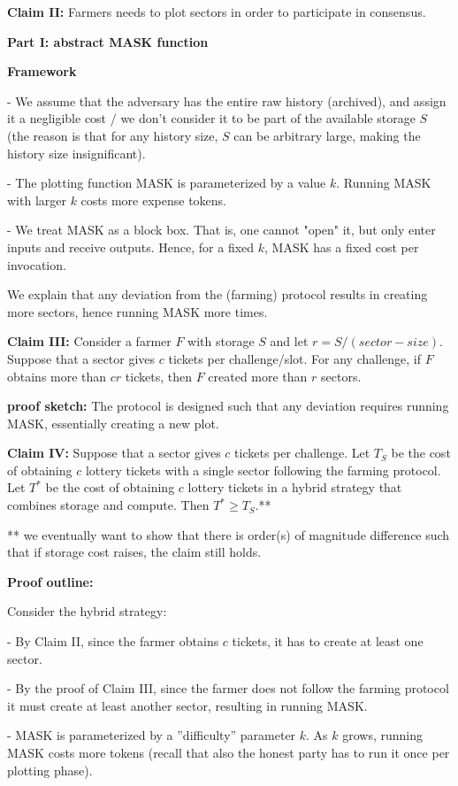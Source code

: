\documentclass[12pt,draftcls,onecolumn]{IEEEtran}
\begin{document}
{\bf Claim II:} Farmers needs to plot sectors in order to participate in consensus.


\textbf{Part I: abstract MASK function}

\textbf{Framework}

- We assume that the adversary has the entire raw history (archived), and assign it a negligible cost / we don't consider it to be part of the available storage $S$ (the reason is that for any history size, $S$ can be arbitrary large, making the history size insignificant).

- The plotting function MASK is parameterized by a value $k$. Running MASK with larger $k$ costs more expense tokens.

- We treat MASK as a block box. That is, one cannot "open" it, but only enter inputs and receive outputs. Hence, for a fixed $k$, MASK has a fixed cost per invocation.



We explain that any deviation from the (farming) protocol results in creating more sectors, hence running MASK more times.

{\bf Claim III:} Consider a farmer $F$ with storage $S$ and let $r = S/(sector-size)$. Suppose that a sector gives $c$ tickets per challenge/slot. For any challenge, if $F$ obtains more than $cr$ tickets, then $F$ created more than $r$ sectors.

{\bf proof sketch:} The protocol is designed such that any deviation requires running MASK, essentially creating a new plot.


{\bf Claim IV:} Suppose that a sector gives $c$ tickets per challenge. Let $T_S$ be the cost of obtaining $c$ lottery tickets with a single sector following the farming protocol. Let $T^*$ be the cost of obtaining $c$ lottery tickets in a hybrid strategy that combines storage and compute. Then $T^* \geq T_S$.**

** we eventually want to show that there is order(s) of magnitude difference such that if storage cost raises, the claim still holds.


{\bf Proof outline:}

Consider the hybrid strategy:

- By Claim II, since the farmer obtains $c$ tickets, it has to create at least one sector.

- By the proof of Claim III, since the farmer does not follow the farming protocol it must create at least another sector, resulting in running MASK.

- MASK is parameterized by a ''difficulty'' parameter $k$. As $k$ grows, running MASK costs more tokens (recall that also the honest party has to run it once per plotting phase).
\end{document}
